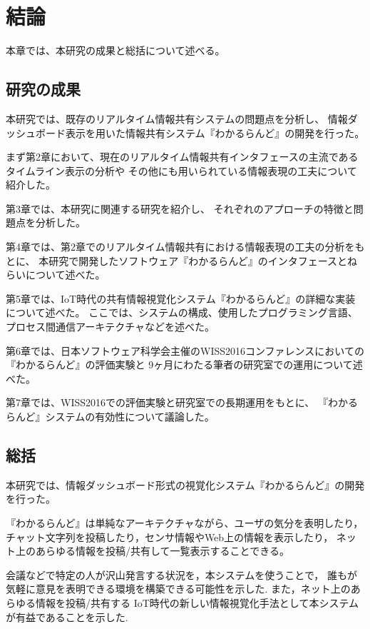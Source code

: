 \chapter{結論}
\label{chap:conclusion}

本章では、本研究の成果と総括について述べる。

\newpage

\section{研究の成果}

本研究では、既存のリアルタイム情報共有システムの問題点を分析し、
情報ダッシュボード表示を用いた情報共有システム『わかるらんど』の開発を行った。

まず第2章において、現在のリアルタイム情報共有インタフェースの主流であるタイムライン表示の分析や
その他にも用いられている情報表現の工夫について紹介した。

第3章では、本研究に関連する研究を紹介し、
それぞれのアプローチの特徴と問題点を分析した。

第4章では、第2章でのリアルタイム情報共有における情報表現の工夫の分析をもとに、
本研究で開発したソフトウェア『わかるらんど』のインタフェースとねらいについて述べた。

第5章では、IoT時代の共有情報視覚化システム『わかるらんど』の詳細な実装について述べた。
ここでは、システムの構成、使用したプログラミング言語、プロセス間通信アーキテクチャなどを述べた。

第6章では、日本ソフトウェア科学会主催のWISS2016コンファレンスにおいての『わかるらんど』の評価実験と
9ヶ月にわたる筆者の研究室での運用について述べた。

第7章では、WISS2016での評価実験と研究室での長期運用をもとに、
『わかるらんど』システムの有効性について議論した。

\section{総括}

本研究では、情報ダッシュボード形式の視覚化システム『わかるらんど』の開発を行った。

『わかるらんど』は単純なアーキテクチャながら、ユーザの気分を表明したり，
チャット文字列を投稿したり，センサ情報やWeb上の情報を表示したり，
ネット上のあらゆる情報を投稿/共有して一覧表示することできる。

会議などで特定の人が沢山発言する状況を，本システムを使うことで，
誰もが気軽に意見を表明できる環境を構築できる可能性を示した.
また，ネット上のあらゆる情報を投稿/共有する
IoT時代の新しい情報視覚化手法として本システムが有益であることを示した.